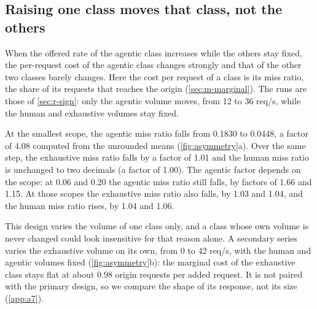 \subsection{Raising one class moves that class, not the others}\label{sec:r-asymmetry}
When the offered rate of the agentic class increases while the others stay fixed, the
per-request cost of the agentic class changes strongly and that of the other two classes
barely changes.
Here the cost per request of a class is its miss ratio, the share of its requests that
reaches the origin (\cref{sec:m-marginal}).
The runs are those of \cref{sec:r-sign}: only the agentic volume moves, from 12 to
36 req/s, while the human and exhaustive volumes stay fixed.

At the smallest scope, the agentic miss ratio falls from 0.1830 to 0.0448, a factor of
4.08 computed from the unrounded means (\cref{fig:asymmetry}a).
Over the same step, the exhaustive miss ratio falls by a factor of 1.01 and the human
miss ratio is unchanged to two decimals (a factor of 1.00).
The agentic factor depends on the scope: at 0.06 and 0.20 the agentic miss ratio still
falls, by factors of 1.66 and 1.15.
At those scopes the exhaustive miss ratio also falls, by 1.03 and 1.04, and the human miss
ratio rises, by 1.04 and 1.06.

This design varies the volume of one class only, and a class whose own volume is never
changed could look insensitive for that reason alone.
A secondary series varies the exhaustive volume on its own, from 0 to 42 req/s, with the
human and agentic volumes fixed (\cref{fig:asymmetry}b): the marginal cost of the exhaustive
class stays flat at about 0.98 origin requests per added request.
It is not paired with the primary design, so we compare the shape of its response, not its
size (\cref{app:a7}).

